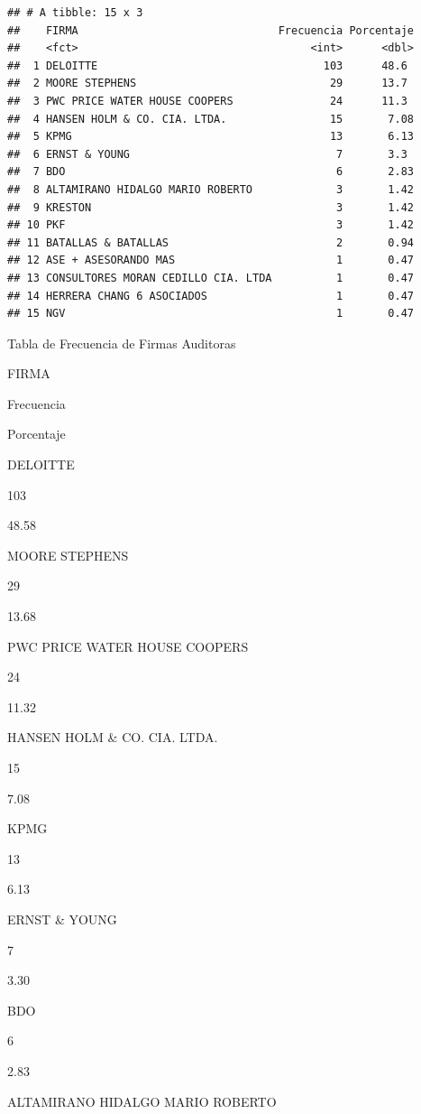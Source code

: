 \documentclass[]{book}
\begin{document}
\begin{verbatim}
## # A tibble: 15 x 3
##    FIRMA                               Frecuencia Porcentaje
##    <fct>                                    <int>      <dbl>
##  1 DELOITTE                                   103      48.6 
##  2 MOORE STEPHENS                              29      13.7 
##  3 PWC PRICE WATER HOUSE COOPERS               24      11.3 
##  4 HANSEN HOLM & CO. CIA. LTDA.                15       7.08
##  5 KPMG                                        13       6.13
##  6 ERNST & YOUNG                                7       3.3 
##  7 BDO                                          6       2.83
##  8 ALTAMIRANO HIDALGO MARIO ROBERTO             3       1.42
##  9 KRESTON                                      3       1.42
## 10 PKF                                          3       1.42
## 11 BATALLAS & BATALLAS                          2       0.94
## 12 ASE + ASESORANDO MAS                         1       0.47
## 13 CONSULTORES MORAN CEDILLO CIA. LTDA          1       0.47
## 14 HERRERA CHANG 6 ASOCIADOS                    1       0.47
## 15 NGV                                          1       0.47
\end{verbatim}

\label{tab:tabla2}Tabla de Frecuencia de Firmas Auditoras

FIRMA

Frecuencia

Porcentaje

DELOITTE

103

48.58

MOORE STEPHENS

29

13.68

PWC PRICE WATER HOUSE COOPERS

24

11.32

HANSEN HOLM \& CO. CIA. LTDA.

15

7.08

KPMG

13

6.13

ERNST \& YOUNG

7

3.30

BDO

6

2.83

ALTAMIRANO HIDALGO MARIO ROBERTO
\end{document}
